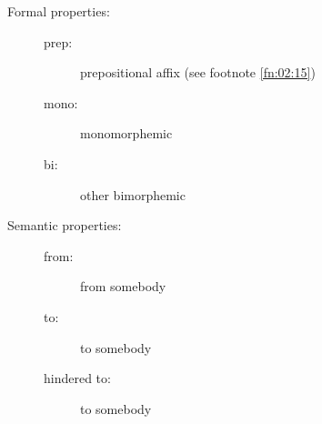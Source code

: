 \documentclass[output=paper]{langscibook}
\begin{document}
\label{falk:appendix:2}
\begin{description}
     \item[Formal properties:] 
       \begin{description}
          \item[]
          \item[prep:] prepositional affix (see footnote \ref{fn:02:15})
          \item[mono:] monomorphemic
          \item[bi:] other bimorphemic 
       \end{description}
     \item[Semantic properties:]
     \begin{description}
          \item[]
          \item[from:]  from somebody
          \item[to:]  to somebody
          \item[hindered to:]  to somebody
      \end{description}
\end{description}
\end{document}
